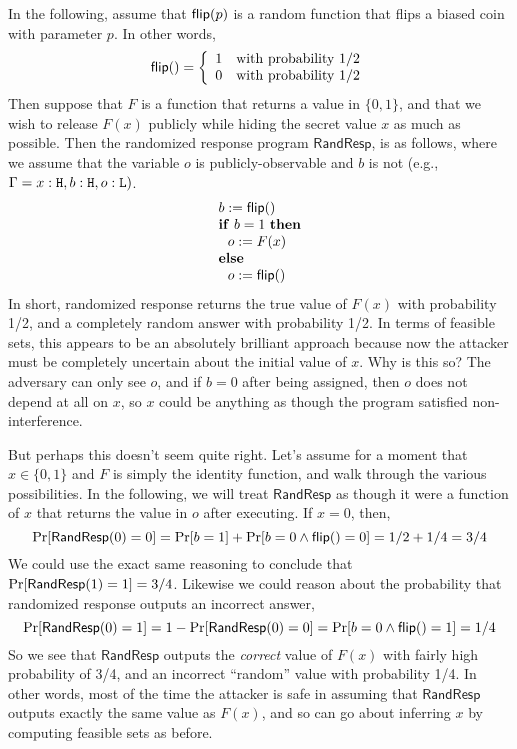 \documentclass[11pt,twoside]{scrartcl}
\begin{document}
In the following, assume that $\mathsf{flip}(p)$ is a random function that flips a biased coin with parameter $p$. In other words,
\begin{equation}
\flip() = 
\left\{
\begin{array}{ll}
%
1 & \mathrm{with\ probability\ } 1/2 \\
0 & \mathrm{with\ probability\ } 1/2
\end{array}
\right.
\end{equation}
Then suppose that $F$ is a function that returns a value in $\{0,1\}$, and that we wish to release $F(x)$ publicly while hiding the secret value $x$ as much as possible. Then the randomized response program $\mathsf{RandResp}$, is as follows, where we assume that the variable $o$ is publicly-observable and $b$ is not (e.g., $\Gamma = x : \texttt{\upshape H}, b : \texttt{\upshape H}, o : \texttt{\upshape L})$.
\begin{equation}
\begin{array}{l}
%
b := \flip() \\
\mathbf{if}\ b = 1\ \mathbf{then} \\
\ \ o := F(x) \\
\mathbf{else} \\
\ \ o := \flip()
\end{array}
\end{equation}
In short, randomized response returns the true value of $F(x)$ with probability 1/2, and a completely random answer with probability 1/2. In terms of feasible sets, this appears to be an absolutely brilliant approach because now the attacker must be completely uncertain about the initial value of $x$. Why is this so? The adversary can only see $o$, and if $b = 0$ after being assigned, then $o$ does not depend at all on $x$, so $x$ could be anything as though the program satisfied non-interference.

But perhaps this doesn't seem quite right. Let's assume for a moment that $x \in \{0,1\}$ and $F$ is simply the identity function, and walk through the various possibilities. In the following, we will treat $\mathsf{RandResp}$ as though it were a function of $x$ that returns the value in $o$ after executing. If $x = 0$, then,
\begin{equation}
\mathrm{Pr}[\mathsf{RandResp}(0) = 0] = \mathrm{Pr}[b = 1] + \mathrm{Pr}[b = 0 \land \mathsf{flip}() = 0] = 1/2 + 1/4 = 3/4
\end{equation}
We could use the exact same reasoning to conclude that $\mathrm{Pr}[\mathsf{RandResp}(1) = 1] = 3/4$. Likewise we could reason about the probability that randomized response outputs an incorrect answer,
\begin{equation}
\mathrm{Pr}[\mathsf{RandResp}(0) = 1] = 1 - \mathrm{Pr}[\mathsf{RandResp}(0) = 0] = \mathrm{Pr}[b = 0 \land \mathsf{flip}() = 1] = 1/4
\end{equation}
So we see that $\mathsf{RandResp}$ outputs the \emph{correct} value of $F(x)$ with fairly high probability of 3/4, and an incorrect ``random'' value with probability 1/4. In other words, most of the time the attacker is safe in assuming that $\mathsf{RandResp}$ outputs exactly the same value as $F(x)$, and so can go about inferring $x$ by computing feasible sets as before. 
\end{document}
